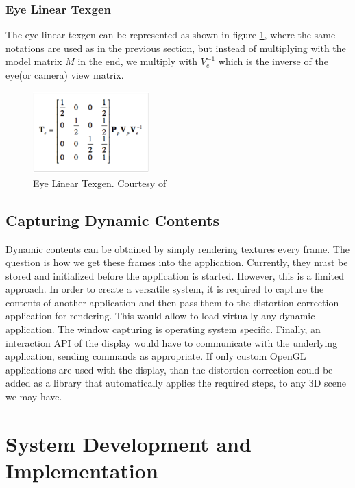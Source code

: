 \documentclass[]{article}
\begin{document}
\subsubsection{Eye Linear Texgen}

The eye linear texgen can be represented as shown in figure \ref{fig:EyeLinearTexgen}, where the same notations are used as in the previous section, but instead of multiplying with the model matrix $M$ in the end, we multiply with $V^{-1}_{e}$ which is the inverse of the eye(or camera) view matrix.

\begin{figure}[hbtp]
    \centering
    \includegraphics[width=0.4\textwidth]{figures/EyeLinearTexgen.PNG}
    \caption{Eye Linear Texgen. Courtesy of \cite{cassNvidia}}
    \label{fig:EyeLinearTexgen}
\end{figure}

\subsection{Capturing Dynamic Contents}

Dynamic contents can be obtained by simply rendering textures every frame. The question is how we get these frames into the application. Currently, they must be stored and initialized before the application is started. However, this is a limited approach. In order to create a versatile system, it is required to capture the contents of another application and then pass them to the distortion correction application for rendering. This would allow to load virtually any dynamic application. The window capturing is operating system specific. Finally, an interaction API of the display would have to communicate with the underlying application, sending commands as appropriate. If only custom OpenGL applications are used with the display, than the distortion correction could be added as a library that automatically applies the required steps, to any 3D scene we may have.

\newpage
\section{System Development and Implementation}
\end{document}
